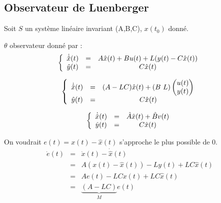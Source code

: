 

\subsection{Observateur de Luenberger}
Soit $S$ un système linéaire invariant (A,B,C), $x(t_0)$ donné.

\bigskip
$\theta$ observateur donné par :
\[\left\{\begin{array}{c c c}
\dot{\hat{x}}(t)&=&A\hat{x}(t)+Bu(t)+L(y(t)-C\hat{x}(t))\\
\hat{y}(t)&=&C\hat{x}(t)
\end{array}\right.\]

\[\left\{\begin{array}{c c c}
\dot{\hat{x}}(t)&=&(A-LC)\hat{x}(t)+\left(B\ L\right) \begin{pmatrix} u(t) \\ y(t) \end{pmatrix}\\
\hat{y}(t)&=&C\hat{x}(t)
\end{array}\right.\]

\[\left\{\begin{array}{c c c}
\dot{\hat{x}}(t)&=&\hat{A}\hat{x}(t)+\hat{B}v(t)\\
\hat{y}(t)&=&C\hat{x}(t)
\end{array}\right.\]

On voudrait $e(t)=x(t)-\hat{x}(t)$ s'approche le plus possible de 0.
\begin{eqnarray*}
\dot{e}(t)&=&\dot{x}(t)-\dot{\hat{x}}(t)\\
	&=&A(x(t)-\hat{x}(t))-Ly(t)+LC\hat{x}(t) \\
	&=&Ae(t)-LCx(t)+LC\hat{x}(t)\\
	&=&\underbrace{(A-LC)}_M e(t)
\end{eqnarray*}

